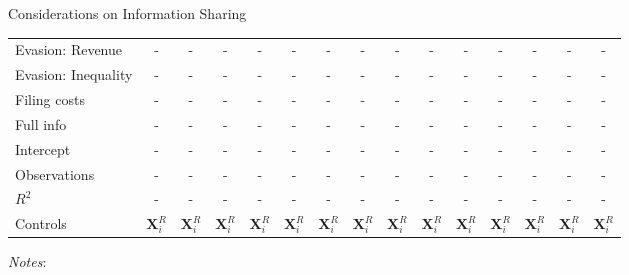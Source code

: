 \documentclass{beamer}
\begin{document}
\begin{frame}{Considerations on Information Sharing}
\begin{table}[!htbp]
{\begin{threeparttable}
\begin{tabular}{l||cc|cc|cc|cc|cc||cc||cc}
Evasion: Revenue        & - & - & - & - & - & -& - & - & - & -& - & - & - & - \\
Evasion: Inequality     & - & - & - & - & - & -& - & - & - & -& - & - & - & - \\
Filing costs            & - & - & - & - & - & -& - & - & - & -& - & - & - & - \\
Full info               & - & - & - & - & - & -& - & - & - & -& - & - & - & - \\[0.5em]

Intercept &- &- &- &- &- &- &- &- &-&- &- &- &- & -\\
\midrule
Observations                        &-    &-    &-    &-    &-    &- &-    &-    &-    &-&-    &-    &-    &-    \\
$R^2$                               &-    &-    &-    &-    &-    &- &-    &-    &-    &-&-    &-    &-    &-    \\
Controls                 &  $\mathbf{X}_{i}^{R}$&  $\mathbf{X}_{i}^{R}$&  $\mathbf{X}_{i}^{R}$&  $\mathbf{X}_{i}^{R}$ &  $\mathbf{X}_{i}^{R}$&  $\mathbf{X}_{i}^{R}$ &  $\mathbf{X}_{i}^{R}$&  $\mathbf{X}_{i}^{R}$&  $\mathbf{X}_{i}^{R}$&  $\mathbf{X}_{i}^{R}$&  $\mathbf{X}_{i}^{R}$&  $\mathbf{X}_{i}^{R}$&  $\mathbf{X}_{i}^{R}$ &  $\mathbf{X}_{i}^{R}$   \\
\bottomrule
\end{tabular}
\begin{tablenotes}[flushleft]
\item \textit{Notes}:   
\end{tablenotes}
\end{threeparttable} }
\end{table}
\hfill \hyperlink{posttreatment}{} \hyperlink{equations1}{}
\end{frame}
\end{document}
